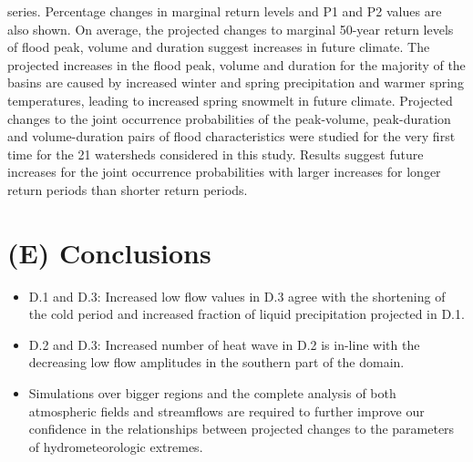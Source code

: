 \documentclass[a0,landscape]{a0poster}
\begin{document}
\begin{multicols*}{4}
\begin{minipage}[t]{\linewidth}
  series. Percentage changes in marginal return levels and P1 and P2 values are
  also shown. On average, the projected changes to marginal 50-year return levels
  of flood peak, volume and duration suggest increases in future climate. The
  projected increases in the flood peak, volume and duration for the majority of
  the basins are caused by increased winter and spring precipitation and warmer
  spring temperatures, leading to increased spring snowmelt in future climate.
  Projected changes to the joint occurrence probabilities of the peak-volume,
  peak-duration and volume-duration pairs of flood characteristics were studied
  for the very first time for the 21 watersheds considered in this study. Results
  suggest future increases for the joint occurrence probabilities with larger
  increases for longer return periods than shorter return periods.

\endgroup
%
\end{minipage}
\hfill
\vspace{2cm}




\color{SaddleBrown} %

\section*{(E) Conclusions}

\begin{itemize}
\item D.1 and D.3: Increased low flow values in D.3 agree with
the shortening of the cold period and increased fraction of liquid precipitation
projected in D.1.

\item D.2 and D.3: Increased number of heat wave in D.2 is
in-line with the decreasing low flow amplitudes in the southern part of the
domain.

\item Simulations over bigger regions and the complete analysis of both
atmospheric fields and streamflows are required to further improve our
confidence in the relationships between projected changes to the parameters of
hydrometeorologic extremes.
\end{itemize}


\end{multicols*}
\end{document}
